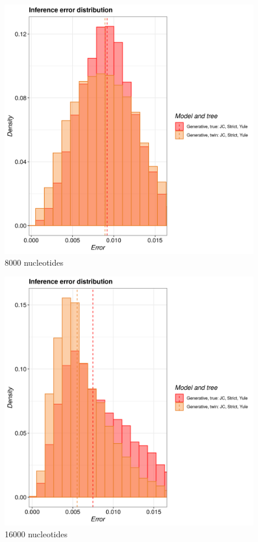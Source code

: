 \begin{figure}[H]
  \includegraphics[width=\textwidth]{pirouette_example_21/example_21_320/errors.png}
  \caption{8000 nucleotides}
\end{figure}

\begin{figure}[H]
  \includegraphics[width=\textwidth]{pirouette_example_21/example_21_321/errors.png}
  \caption{16000 nucleotides}
\end{figure}

